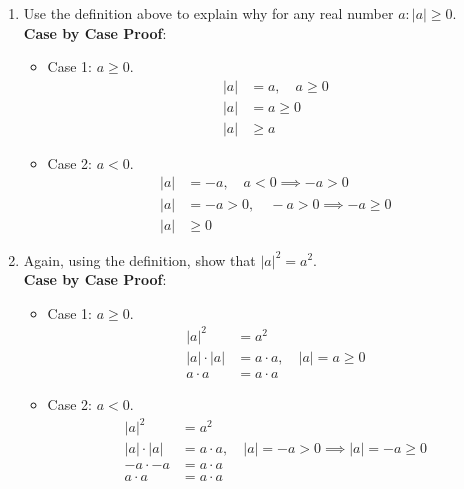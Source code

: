 \documentclass{article}
\begin{document}
\begin{enumerate}[label = \textbf{\alph*)}]
	\item Use the definition above to explain why for any real number $ a : \left| a \right| \geq 0 $. \\
	      \textbf{Case by Case Proof}:
	      \begin{itemize}
		      \item Case 1: $ a \geq 0 $.
		            \begin{align*}
			            |a| & = a, \quad a \geq 0 \\
			            |a| & = a \geq 0          \\
			            |a| & \geq a
		            \end{align*}
		      \item Case 2: $ a < 0 $.
		            \begin{align*}
			            |a| & = -a, \quad a < 0 \implies -a > 0         \\
			            |a| & = -a > 0, \quad -a > 0 \implies -a \geq 0 \\
			            |a| & \geq 0
		            \end{align*}
	      \end{itemize}
	\item Again, using the definition, show that $ |a|^2 = a^2 $. \\
	      \textbf{Case by Case Proof}:
	      \begin{itemize}
		      \item Case 1: $ a \geq 0 $.
		            \begin{align*}
			            |a|^2         & = a^2                             \\
			            |a| \cdot |a| & = a \cdot a, \quad |a| = a \geq 0 \\
			            a \cdot a     & = a \cdot a
		            \end{align*}
		      \item Case 2: $ a < 0 $.
		            \begin{align*}
			            |a|^2         & = a^2                                                    \\
			            |a| \cdot |a| & = a \cdot a, \quad |a| = -a > 0 \implies |a| = -a \geq 0 \\
			            -a \cdot -a   & = a \cdot a                                              \\
			            a \cdot a     & = a \cdot a
		            \end{align*}

\end{itemize}
\end{enumerate}
\end{document}
